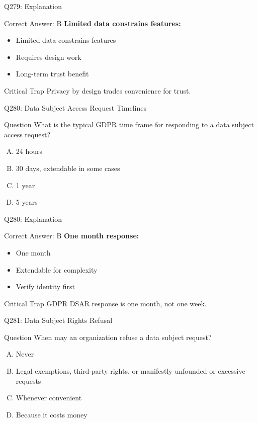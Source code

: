 \documentclass{beamer}
\begin{document}
	\begin{frame}{Q279: Explanation}
		\begin{block}{Correct Answer: B}
			\textbf{Limited data constrains features:}
			\begin{itemize}
				\item Limited data constrains features
				\item Requires design work
				\item Long-term trust benefit
			\end{itemize}
		\end{block}
		\begin{alertblock}{Critical Trap}
			Privacy by design trades convenience for trust.
		\end{alertblock}
	\end{frame}
	
	\begin{frame}{Q280: Data Subject Access Request Timelines}
		\begin{block}{Question}
			What is the typical GDPR time frame for responding to a data subject access request?
		\end{block}
		\begin{enumerate}[(A)]
			\item 24 hours
			\item 30 days, extendable in some cases
			\item 1 year
			\item 5 years
		\end{enumerate}
	\end{frame}
	
	\begin{frame}{Q280: Explanation}
		\begin{block}{Correct Answer: B}
			\textbf{One month response:}
			\begin{itemize}
				\item One month
				\item Extendable for complexity
				\item Verify identity first
			\end{itemize}
		\end{block}
		\begin{alertblock}{Critical Trap}
			GDPR DSAR response is one month, not one week.
		\end{alertblock}
	\end{frame}
	
	\begin{frame}{Q281: Data Subject Rights Refusal}
		\begin{block}{Question}
			When may an organization refuse a data subject request?
		\end{block}
		\begin{enumerate}[(A)]
			\item Never
			\item Legal exemptions, third-party rights, or manifestly unfounded or excessive requests
			\item Whenever convenient
			\item Because it costs money
		\end{enumerate}
	\end{frame}
	
\end{document}
